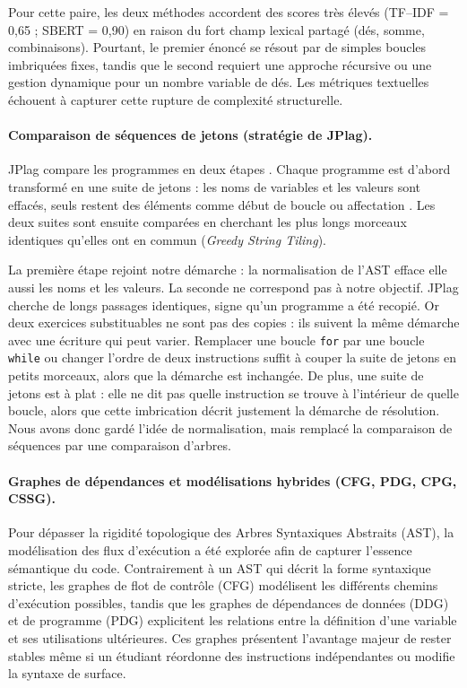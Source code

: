 \documentclass[12pt,a4paper,oneside]{report}
\begin{document}
Pour cette paire, les deux méthodes accordent des scores très élevés (TF--IDF = 0,65 ; SBERT = 0,90) en raison du fort
champ lexical partagé (dés, somme, combinaisons). Pourtant, le premier énoncé se résout par de simples boucles imbriquées
fixes, tandis que le second requiert une approche récursive ou une gestion dynamique pour un nombre variable de dés.
Les métriques textuelles échouent à capturer cette rupture de complexité structurelle.

\paragraph{Comparaison de séquences de jetons (stratégie de JPlag).}

JPlag compare les programmes en deux étapes \cite{prechelt_finding_nodate}.
Chaque programme est d'abord transformé en une suite de jetons : les noms de
variables et les valeurs sont effacés, seuls restent des éléments comme
\og début de boucle \fg{} ou \og affectation \fg{}. Les deux suites sont
ensuite comparées en cherchant les plus longs morceaux identiques qu'elles
ont en commun (\emph{Greedy String Tiling}).

La première étape rejoint notre démarche : la normalisation de l'AST efface
elle aussi les noms et les valeurs. La seconde ne correspond pas à notre
objectif. JPlag cherche de longs passages identiques, signe qu'un programme
a été recopié. Or deux exercices substituables ne sont pas des copies : ils
suivent la même démarche avec une écriture qui peut varier. Remplacer une
boucle \texttt{for} par une boucle \texttt{while} ou changer l'ordre de deux
instructions suffit à couper la suite de jetons en petits morceaux, alors
que la démarche est inchangée. De plus, une suite de jetons est
\og à plat \fg{} : elle ne dit pas quelle instruction se trouve à
l'intérieur de quelle boucle, alors que cette imbrication décrit justement
la démarche de résolution. Nous avons donc gardé l'idée de normalisation,
mais remplacé la comparaison de séquences par une comparaison d'arbres.


 

\paragraph{Graphes de dépendances et modélisations hybrides (CFG, PDG, CPG, CSSG).}

Pour dépasser la rigidité topologique des Arbres Syntaxiques Abstraits (AST), la modélisation des flux d'exécution a été explorée afin de capturer l'essence sémantique du code. Contrairement à un AST qui décrit la forme syntaxique stricte, les graphes de flot de contrôle (CFG) modélisent les différents chemins d'exécution possibles, tandis que les graphes de dépendances de données (DDG) et de programme (PDG) explicitent les relations entre la définition d'une variable et ses utilisations ultérieures. Ces graphes présentent l'avantage majeur de rester stables même si un étudiant réordonne des instructions indépendantes ou modifie la syntaxe de surface.
\end{document}
